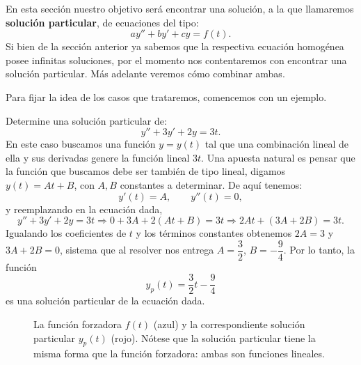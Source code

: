 En esta secci\'on nuestro objetivo ser\'a encontrar una soluci\'on, a la que llamaremos \textbf{soluci\'on particular}, de ecuaciones del tipo:
\[
ay''+by'+cy=f(t).
\]
Si bien de la secci\'on anterior ya sabemos que la respectiva ecuaci\'on homog\'enea posee infinitas soluciones, por el momento nos contentaremos con encontrar una soluci\'on particular. M\'as adelante veremos c\'omo combinar ambas.

Para fijar la idea de los casos que trataremos, comencemos con un ejemplo.

\begin{example}
    Determine una soluci\'on particular de:
    \[
    y''+3y'+2y=3t.
    \]
    En este caso buscamos una funci\'on $y=y(t)$ tal que una combinaci\'on lineal de ella y sus derivadas genere la funci\'on lineal $3t$. Una apuesta natural es pensar que la funci\'on que buscamos debe ser tambi\'en de tipo lineal, digamos $y(t)=At+B$, con $A,B$ constantes a determinar. De aqu\'i tenemos:
    \[
    y'(t)=A,\qquad y''(t)=0,
    \]
    y reemplazando en la ecuaci\'on dada,
    \[
    y''+3y'+2y=3t\Longrightarrow 0+3A+2(At+B)=3t\Longrightarrow 2At+(3A+2B)=3t.
    \]
    Igualando los coeficientes de $t$ y los t\'erminos constantes obtenemos $2A=3$ y $3A+2B=0$, sistema que al resolver nos entrega $A=\dfrac{3}{2}$, $B=-\dfrac{9}{4}$. Por lo tanto, la funci\'on
    \[
    y_p(t)=\dfrac{3}{2}t-\dfrac{9}{4}
    \]
    es una soluci\'on particular de la ecuaci\'on dada.
\end{example}

\begin{figure}[h!]
    \centering
    \caption{La funci\'on forzadora $f(t)$ (azul) y la correspondiente soluci\'on particular $y_p(t)$ (rojo). N\'otese que la soluci\'on particular tiene la misma forma que la funci\'on forzadora: ambas son funciones lineales.}
    \label{fig:forzadora_vs_particular}
\end{figure}

